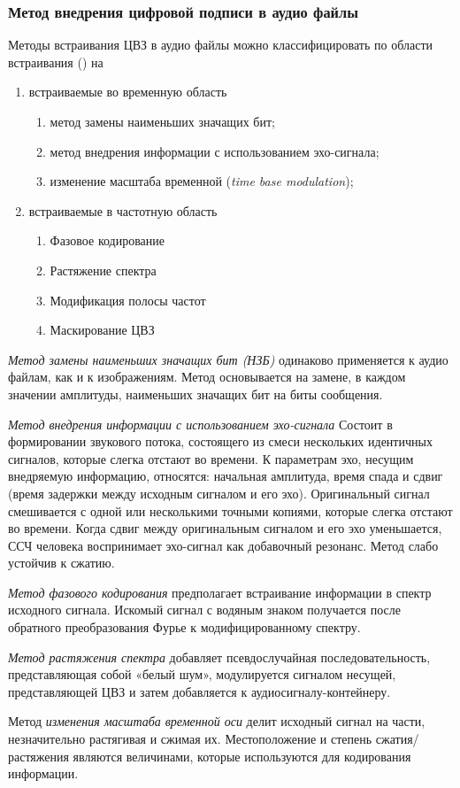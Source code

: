 
\subsubsection{Метод внедрения цифровой подписи в аудио файлы}
\par  Методы встраивания ЦВЗ в аудио файлы можно классифицировать по области встраивания (\cite{borisova2015}) на
\begin{enumerate}
\item встраиваемые во временную область
		\begin{enumerate}
			\item метод замены наименьших значащих бит;
			\item метод внедрения информации с использованием эхо-сигнала;
			\item изменение масштаба временной (\textit{time base modulation});
		\end{enumerate}
\item встраиваемые в частотную область
		\begin{enumerate}
			\item Фазовое кодирование
			\item Растяжение спектра
			\item Модификация полосы частот
			\item Маскирование ЦВЗ
		\end{enumerate}
\end{enumerate} 
\par \textit{Метод замены наименьших значащих бит (НЗБ)} одинаково применяется к аудио файлам, как и к изображениям. Метод основывается на замене, в каждом значении амплитуды, наименьших значащих бит на биты сообщения. 
\par \textit{ Метод внедрения информации с использованием эхо-сигнала} Состоит в формировании звукового потока, состоящего из смеси нескольких идентичных сигналов, которые слегка отстают во времени. К параметрам эхо, несущим внедряемую
информацию, относятся: начальная амплитуда, время спада и сдвиг (время задержки между исходным сигналом и его эхо). Оригинальный сигнал смешивается с одной или несколькими точными копиями, которые слегка отстают во времени. Когда сдвиг
между оригинальным сигналом и его эхо уменьшается, ССЧ человека воспринимает эхо-сигнал как добавочный резонанс. Метод слабо устойчив к сжатию.
\par \textit {Метод фазового кодирования} предполагает встраивание информации в спектр исходного сигнала. Искомый сигнал с водяным знаком получается после обратного преобразования Фурье к модифицированному спектру.
 \par \textit {Метод растяжения спектра} добавляет псевдослучайная последовательность, представляющая собой «белый шум», модулируется сигналом несущей, представляющей ЦВЗ и затем добавляется к аудиосигналу-контейнеру.
 \par Метод \textit {изменения масштаба временной оси}  делит исходный сигнал на части, незначительно
 растягивая и сжимая  их. Местоположение и степень сжатия/растяжения являются величинами, которые используются для кодирования информации.
 

